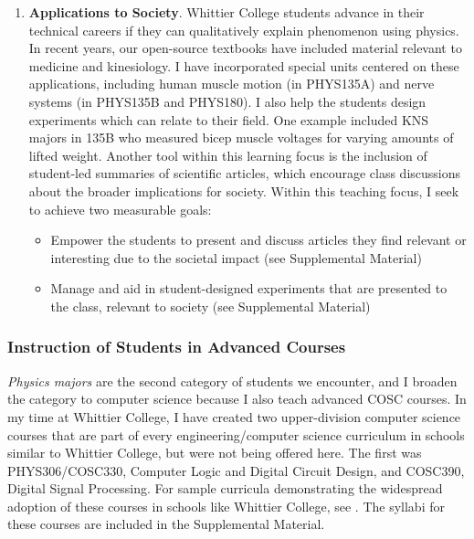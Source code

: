 \documentclass[../../main.tex]{subfiles}
\begin{document}
\begin{enumerate}
\item \textbf{Applications to Society}. Whittier College students advance in their technical careers if they can qualitatively explain phenomenon using physics.  In recent years, our open-source textbooks \cite{openstax1} \cite{openstax2} have included material relevant to medicine and kinesiology. I have incorporated special units centered on these applications, including human muscle motion (in PHYS135A) and nerve systems (in PHYS135B and PHYS180).  I also help the students design experiments which can relate to their field.  One example included KNS majors in 135B who measured bicep muscle voltages for varying amounts of lifted weight.  Another tool within this learning focus is the inclusion of student-led summaries of scientific articles, which encourage class discussions about the broader implications for society.  Within this teaching focus, I seek to achieve two measurable goals:

\begin{itemize}
\item Empower the students to present and discuss articles they find relevant or interesting due to the societal impact (see Supplemental Material)
\item Manage and aid in student-designed experiments that are presented to the class, relevant to society (see Supplemental Material)
\end{itemize}

\end{enumerate}

\subsubsection{Instruction of Students in Advanced Courses}

\label{sec:teaching_phil2}

\textit{Physics majors} are the second category of students we encounter, and I broaden the category to computer science because I also teach advanced COSC courses.  In my time at Whittier College, I have created two upper-division computer science courses that are part of every engineering/computer science curriculum in schools similar to Whittier College, but were not being offered here.  The first was PHYS306/COSC330, Computer Logic and Digital Circuit Design, and COSC390, Digital Signal Processing.  For sample curricula demonstrating the widespread adoption of these courses in schools like Whittier College, see \cite{BiolaCR} \cite{LMUCR}.  The syllabi for these courses are included in the Supplemental Material.  \\ \hspace{0.1cm}
\end{document}
